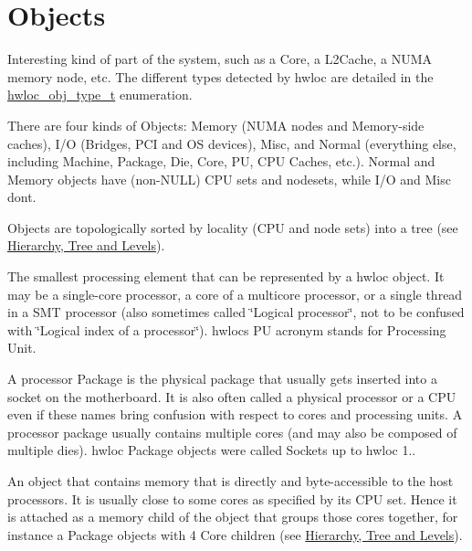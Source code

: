  \hypertarget{a00380_termsanddefs_objects}{}\section{Objects}\label{a00380_termsanddefs_objects}

\begin{DoxyDescription}
\item[Object ]Interesting kind of part of the system, such as a Core, a L2\+Cache, a N\+U\+MA memory node, etc. The different types detected by hwloc are detailed in the \hyperlink{a00184_gacd37bb612667dc437d66bfb175a8dc55}{hwloc\+\_\+obj\+\_\+type\+\_\+t} enumeration.

There are four kinds of Objects\+: Memory (N\+U\+MA nodes and Memory-\/side caches), I/O (Bridges, P\+CI and OS devices), Misc, and Normal (everything else, including Machine, Package, Die, Core, PU, C\+PU Caches, etc.). Normal and Memory objects have (non-\/\+N\+U\+LL) C\+PU sets and nodesets, while I/O and Misc don\textquotesingle{}t.

Objects are topologically sorted by locality (C\+PU and node sets) into a tree (see \hyperlink{a00380_termsanddefs_tree}{Hierarchy, Tree and Levels}). 


\item[Processing Unit (PU) ]The smallest processing element that can be represented by a hwloc object. It may be a single-\/core processor, a core of a multicore processor, or a single thread in a S\+MT processor (also sometimes called \char`\"{}\+Logical processor\char`\"{}, not to be confused with \char`\"{}\+Logical index of a processor\char`\"{}). hwloc\textquotesingle{}s PU acronym stands for Processing Unit. 


\item[Package ]A processor Package is the physical package that usually gets inserted into a socket on the motherboard. It is also often called a physical processor or a C\+PU even if these names bring confusion with respect to cores and processing units. A processor package usually contains multiple cores (and may also be composed of multiple dies). hwloc Package objects were called Sockets up to hwloc 1.. 


\item[N\+U\+MA Node ]An object that contains memory that is directly and byte-\/accessible to the host processors. It is usually close to some cores as specified by its C\+PU set. Hence it is attached as a memory child of the object that groups those cores together, for instance a Package objects with 4 Core children (see \hyperlink{a00380_termsanddefs_tree}{Hierarchy, Tree and Levels}). 



\end{DoxyDescription}
